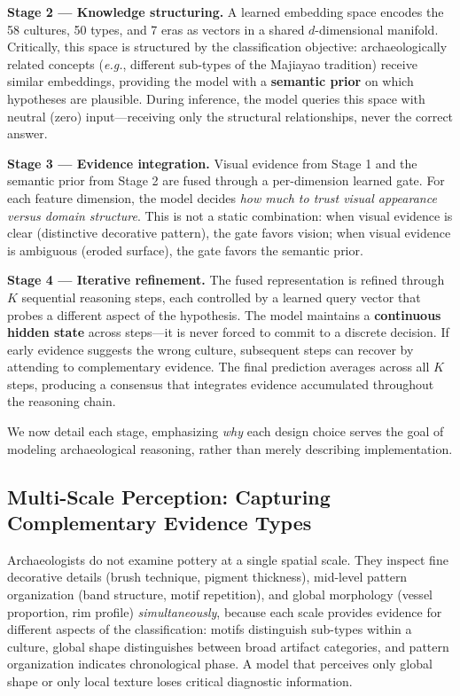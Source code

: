 \documentclass[10pt,twocolumn,letterpaper]{article}
\begin{document}
\textbf{Stage 2 — Knowledge structuring.} A learned embedding space encodes the 58 cultures, 50 types, and 7 eras as vectors in a shared $d$-dimensional manifold. Critically, this space is structured by the classification objective: archaeologically related concepts (\emph{e.g.}, different sub-types of the Majiayao tradition) receive similar embeddings, providing the model with a \textbf{semantic prior} on which hypotheses are plausible. During inference, the model queries this space with neutral (zero) input---receiving only the structural relationships, never the correct answer.

\textbf{Stage 3 — Evidence integration.} Visual evidence from Stage 1 and the semantic prior from Stage 2 are fused through a per-dimension learned gate. For each feature dimension, the model decides \emph{how much to trust visual appearance versus domain structure}. This is not a static combination: when visual evidence is clear (distinctive decorative pattern), the gate favors vision; when visual evidence is ambiguous (eroded surface), the gate favors the semantic prior.

\textbf{Stage 4 — Iterative refinement.} The fused representation is refined through $K$ sequential reasoning steps, each controlled by a learned query vector that probes a different aspect of the hypothesis. The model maintains a \textbf{continuous hidden state} across steps---it is never forced to commit to a discrete decision. If early evidence suggests the wrong culture, subsequent steps can recover by attending to complementary evidence. The final prediction averages across all $K$ steps, producing a consensus that integrates evidence accumulated throughout the reasoning chain.

We now detail each stage, emphasizing \emph{why} each design choice serves the goal of modeling archaeological reasoning, rather than merely describing implementation.

\subsection{Multi-Scale Perception: Capturing Complementary Evidence Types}

Archaeologists do not examine pottery at a single spatial scale. They inspect fine decorative details (brush technique, pigment thickness), mid-level pattern organization (band structure, motif repetition), and global morphology (vessel proportion, rim profile) \emph{simultaneously}, because each scale provides evidence for different aspects of the classification: motifs distinguish sub-types within a culture, global shape distinguishes between broad artifact categories, and pattern organization indicates chronological phase. A model that perceives only global shape or only local texture loses critical diagnostic information.
\end{document}
